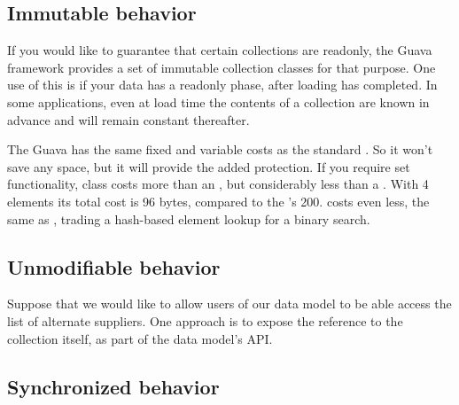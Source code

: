 \subsection{Immutable behavior}
\label{sec:immutable-collections}
If you would like to guarantee that certain collections are readonly, the Guava
framework provides a set of immutable collection classes for that
purpose. One use of this is if your data has a readonly phase, after loading has
completed.
In some applications, even at load time the contents of a collection are known
in advance and will remain constant thereafter.  

The Guava  has the same fixed and variable costs as the
standard .  So it won't save any space, but it will provide the
added protection.  If you require set functionality, class 
costs more than an , but considerably less than a .
With 4 elements its total cost is 96 bytes, compared to
the 's 200.  costs even less, the same
as , trading a hash-based element lookup for a binary search.

\subsection{Unmodifiable behavior}
\label{sec:unmodifiable-collections}
Suppose that we would like to allow users of our data model to be able access
the list of alternate suppliers.  One approach is to expose the reference to the
collection itself, as part of the data model's API.

\subsection{Synchronized behavior}
\label{sec:synchronized-collections}

